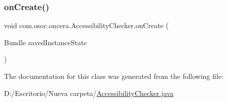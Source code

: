 \subsubsection{\texorpdfstring{onCreate()}{onCreate()}}
{\footnotesize\ttfamily void com.\+osoc.\+oncera.\+Accessibility\+Checker.\+on\+Create (\begin{DoxyParamCaption}\item[{Bundle}]{saved\+Instance\+State }\end{DoxyParamCaption})\hspace{0.3cm}{\ttfamily [protected]}}



The documentation for this class was generated from the following file\+:\begin{DoxyCompactItemize}
\item 
D\+:/\+Escritorio/\+Nueva carpeta/\mbox{\hyperlink{_accessibility_checker_8java}{Accessibility\+Checker.\+java}}\end{DoxyCompactItemize}
